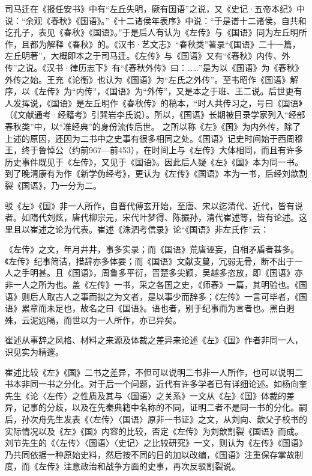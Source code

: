 \documentclass[a4paper,12pt,UTF8,twoside]{ctexbook}
\begin{document}
司马迁在《报任安书》中有“左丘失明，厥有国语”之说，又《史记·五帝本纪》中说：“余观《春秋》《国语》。”《十二诸侯年表序》中说：“于是谱十二诸侯，自共和讫孔子，表见《春秋》《国语》。”于是后人有认为《左传》与《国语》同为左丘明所作，且都为解释《春秋》的。《汉书·艺文志》“春秋类”著录“《国语》二十一篇，左丘明著”，大概即本之于司马迁。《左传》与《国语》又有“《春秋》内传、外传”之说。《汉书·律历志下》有“《春秋外传》曰：……”是为以《国语》为《春秋》外传之始。王充《论衡》也认为《国语》为“左氏之外传”。至韦昭作《国语》解序，以《左传》为“内传”，《国语》为“外传”，又是本之于班、王二说。后世更有人发挥说，《国语》是左丘明作《春秋传》的稿本，“时人共传习之，号曰《国语》（《文献通考·经籍考》引巽岩李氏说）。所以，《国语》长期被目录学家列入“经部春秋类”中，以“准经典”的身份流传后世。
之所以称《左》《国》为内外传，除了上述的原因，还因为二书中之史事有很多相同之处。《国语》记史时间始于西周穆王，终于鲁悼公（约前967—前453），在时间上与《左传》大体相同，而且有许多历史事件既见于《左传》，又见于《国语》。因此后人疑《左》《国》本为同一书。到了晚清康有为作《新学伪经考》，更认为《左传》《国语》本为一书，后经刘歆割裂《国语》，乃一分为二。

驳《左》《国》非一人所作，自晋代傅玄开始，至唐、宋以迄清代、近代，皆有说者。如隋代刘炫，唐代柳宗元，宋代叶梦得、陈振孙，清代崔述等，皆有论述。这里且以崔述之论为代表。崔述《洙泗考信录》论“《国语》非左氏作”云：

《左传》之文，年月井井，事多实录；而《国语》荒唐诬妄，自相矛盾者甚多。《左传》纪事简洁，措辞亦多体要；而《国语》文献支蔓，冗弱无骨，断不出于一人之手明甚。且《国语》，周鲁多平衍，晋楚多尖颖，吴越多恣放，即《国语》亦非一人之所为也。盖《左传》一书，采之各国之史，《师春》一篇，其明验也。《国语》则后人取古人之事而拟之为文者，是以事少而辞多；《左传》一言可毕者，《国语》累章而未足也，故名之曰《国语》。语也者，别于纪事而为言者也。黑白迥殊，云泥远隔，而世以为一人所作，亦已异矣。

崔述从事辞之风格、材料之来源及体裁之差异来论述《左》《国》作者非同一人，识见实为精邃。

崔述比较《左》《国》二书之差异，不但可以说明二书非一人所作，也可以说明二书本非同一书之分化。对于后一个问题，近代有许多学者已有详细论述。如杨向奎先生《论〈左传〉之性质及其与〈国语〉之关系》一文从《左》《国》体裁的差异，记事的分歧，以及在先秦典籍中名称的不同，证明二者不是同一书的分化。嗣后，孙次舟先生发表《〈左传〉〈国语〉原非一书证》之文，从刘向、歆父子校书的实际情况以及《左》《国》内容的比较，否定《左传》为刘歆割裂《国语》而成。刘节先生的《〈左传〉〈国语〉〈史记〉之比较研究》一文，则认为《左传》《国语》乃共同依据一种原始史料，然后按不同的目的加以改编，《国语》注重保存掌故制度，而《左传》注意政治和战争方面的史事，再次反驳割裂说。
\end{document}
